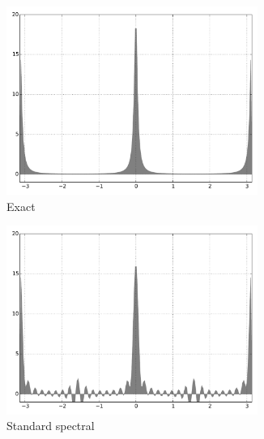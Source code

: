\documentclass[final,leqno]{siamart}
\begin{document}
\begin{figure}[h!]
	\hspace*{-.5cm}
	\begin{subfigure}{0.36\textwidth}
		\includegraphics[width=0.9\textwidth]{./images/exact_1D.pdf}
		\caption{Exact}
		\label{fig:exact}
	\end{subfigure}
	\hspace*{-.65cm}
	\begin{subfigure}{0.36\textwidth}
		\includegraphics[width=0.9\textwidth]{./images/standard_spectral_1D.pdf}
		\caption{Standard spectral}
		\label{fig:standard spectral}
	\end{subfigure}
	\hspace*{-.65cm}
	\begin{subfigure}{0.36\textwidth}

\end{subfigure}
\end{figure}
\end{document}

